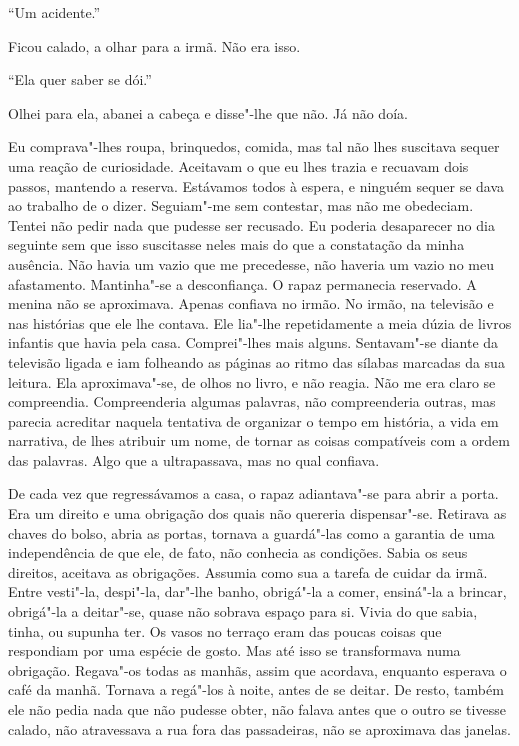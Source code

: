 ``Um acidente.''

Ficou calado, a olhar para a irmã. Não era isso.

``Ela quer saber se dói.''

Olhei para ela, abanei a cabeça e disse"-lhe que não. Já não doía.

Eu comprava"-lhes roupa, brinquedos, comida, mas tal não lhes suscitava
sequer uma reação de curiosidade. Aceitavam o que eu lhes trazia e
recuavam dois passos, mantendo a reserva. Estávamos todos à espera, e
ninguém sequer se dava ao trabalho de o dizer. Seguiam"-me sem
contestar, mas não me obedeciam. Tentei não pedir nada que pudesse ser
recusado. Eu poderia desaparecer no dia seguinte sem que isso suscitasse
neles mais do que a constatação da minha ausência. Não havia um vazio
que me precedesse, não haveria um vazio no meu afastamento. Mantinha"-se
a desconfiança. O rapaz permanecia reservado. A menina não se
aproximava. Apenas confiava no irmão. No irmão, na televisão e nas
histórias que ele lhe contava. Ele lia"-lhe repetidamente a meia dúzia
de livros infantis que havia pela casa. Comprei"-lhes mais alguns.
Sentavam"-se diante da televisão ligada e iam folheando as páginas ao
ritmo das sílabas marcadas da sua leitura. Ela aproximava"-se, de olhos
no livro, e não reagia. Não me era claro se compreendia. Compreenderia
algumas palavras, não compreenderia outras, mas parecia acreditar
naquela tentativa de organizar o tempo em história, a vida em narrativa,
de lhes atribuir um nome, de tornar as coisas compatíveis com a ordem
das palavras. Algo que a ultrapassava, mas no qual confiava.

De cada vez que regressávamos a casa, o rapaz adiantava"-se para abrir a
porta. Era um direito e uma obrigação dos quais não quereria
dispensar"-se. Retirava as chaves do bolso, abria as portas, tornava a
guardá"-las como a garantia de uma independência de que ele, de fato,
não conhecia as condições. Sabia os seus direitos, aceitava as
obrigações. Assumia como sua a tarefa de cuidar da irmã. Entre
vesti"-la, despi"-la, dar"-lhe banho, obrigá"-la a comer, ensiná"-la a
brincar, obrigá"-la a deitar"-se, quase não sobrava espaço para si.
Vivia do que sabia, tinha, ou supunha ter. Os vasos no terraço eram das
poucas coisas que respondiam por uma espécie de gosto. Mas até isso se
transformava numa obrigação. Regava"-os todas as manhãs, assim que
acordava, enquanto esperava o café da manhã. Tornava a regá"-los à
noite, antes de se deitar. De resto, também ele não pedia nada que não
pudesse obter, não falava antes que o outro se tivesse calado, não
atravessava a rua fora das passadeiras, não se aproximava das janelas.

